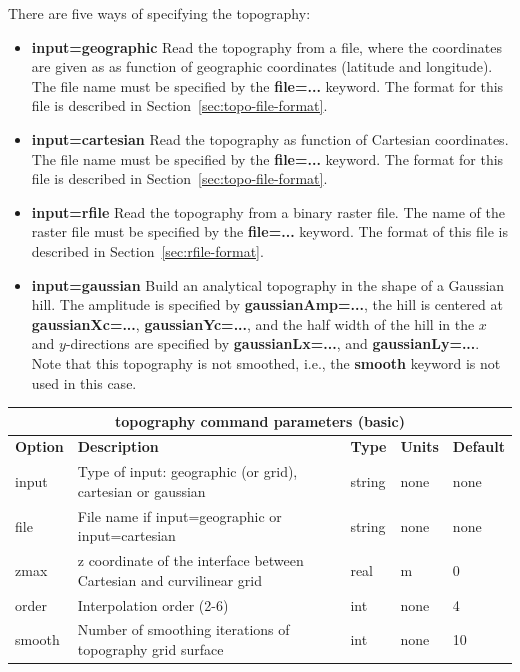 \documentclass[11pt]{report}
\begin{document}
There are five ways of specifying the topography:
\begin{itemize}
\item {\bf input=geographic} Read the topography from a file, where the coordinates are given as as
  function of geographic coordinates (latitude and longitude). The file name must be specified by
  the {\bf file=...} keyword. The format for this file is described in Section~\ref{sec:topo-file-format}.
\item {\bf input=cartesian} Read the topography as function of Cartesian coordinates. The file name
   must be specified by the {\bf file=...} keyword. The format for this file is described in
   Section~\ref{sec:topo-file-format}.
\item {\bf input=rfile} Read the topography from a binary raster file. The name of the raster file
   must be specified by the {\bf file=...} keyword. The format of this file is described in
   Section~\ref{sec:rfile-format}.
\item {\bf input=gaussian} Build an analytical topography in the shape of a Gaussian hill. The
  amplitude is specified by {\bf gaussianAmp=...}, the hill is centered at {\bf gaussianXc=...},
  {\bf gaussianYc=...}, and the half width of the hill in the $x$ and $y$-directions are specified by 
   {\bf gaussianLx=...}, and {\bf gaussianLy=...}. Note that this topography is not smoothed, i.e.,
   the {\bf smooth} keyword is not used in this case.
\end{itemize}
%
\begin{center}
\begin{tabular}{|l|p{8cm}|l|l|l|} \hline
\multicolumn{5}{|c|}{\bf topography command parameters (basic)}\\ \hline
\bf{Option} & \bf{Description} & \bf{Type} & \bf{Units} & \bf{Default}\\ \hline \hline
%
input & Type of input: geographic (or grid), cartesian or gaussian & string & none & none\\ \hline
%
file & File name if input=geographic or input=cartesian & string & none & none\\ \hline
%
%
%
%
zmax & z coordinate of the interface between  Cartesian and curvilinear grid& real &  m & 0\\ \hline
%
order & Interpolation order (2-6) & int & none & 4\\ \hline
%
smooth & Number of smoothing iterations of topography grid surface & int & none & 10 \\ \hline
\end{tabular}
\end{center}
\end{document}
